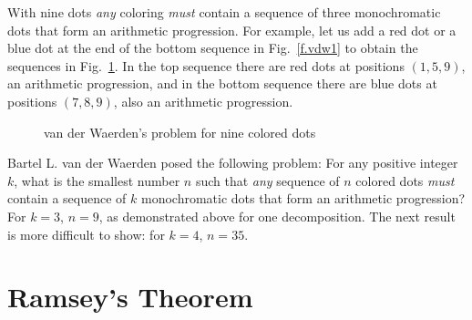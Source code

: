 With nine dots \emph{any} coloring \emph{must} contain a sequence of three monochromatic dots that form an arithmetic progression. For example, let us add a red dot or a blue dot at the end of the bottom sequence in Fig.~\ref{f.vdw1} to obtain the sequences in Fig.~\ref{f.vdw2}. In the top sequence there are red dots at positions $(1,5,9)$, an arithmetic progression, and in the bottom sequence there are blue dots at positions $(7,8,9)$, also an arithmetic progression.
\begin{figure}[htb]
\begin{center}
\end{center}
\caption{van der Waerden's problem for nine colored dots}\label{f.vdw2}
\end{figure}


Bartel L. van der Waerden posed the following problem: For any positive integer $k$, what is the smallest number $n$ such that \emph{any} sequence of $n$ colored dots \emph{must} contain a sequence of $k$ monochromatic dots that form an arithmetic progression? For $k=3$, $n=9$, as demonstrated above for one decomposition. The next result is more difficult to show: for $k=4$, $n=35$.




\section{Ramsey's Theorem}\label{s.ramsey}

